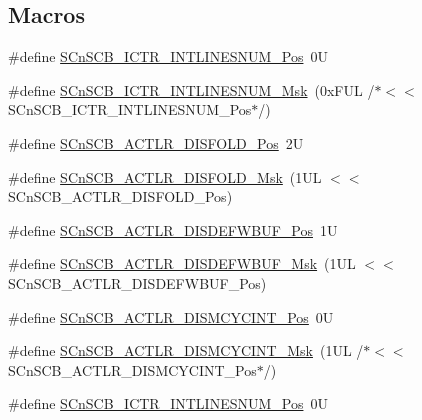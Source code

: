 \subsection*{Macros}
\begin{DoxyCompactItemize}
\item 
\#define \hyperlink{group___c_m_s_i_s___s_cn_s_c_b_ga0777ddf379af50f9ca41d40573bfffc5}{S\-Cn\-S\-C\-B\-\_\-\-I\-C\-T\-R\-\_\-\-I\-N\-T\-L\-I\-N\-E\-S\-N\-U\-M\-\_\-\-Pos}~0\-U
\item 
\#define \hyperlink{group___c_m_s_i_s___s_cn_s_c_b_ga3efa0f5210051464e1034b19fc7b33c7}{S\-Cn\-S\-C\-B\-\_\-\-I\-C\-T\-R\-\_\-\-I\-N\-T\-L\-I\-N\-E\-S\-N\-U\-M\-\_\-\-Msk}~(0x\-F\-U\-L /$\ast$$<$$<$ S\-Cn\-S\-C\-B\-\_\-\-I\-C\-T\-R\-\_\-\-I\-N\-T\-L\-I\-N\-E\-S\-N\-U\-M\-\_\-\-Pos$\ast$/)
\item 
\#define \hyperlink{group___c_m_s_i_s___s_cn_s_c_b_gaab395870643a0bee78906bb15ca5bd02}{S\-Cn\-S\-C\-B\-\_\-\-A\-C\-T\-L\-R\-\_\-\-D\-I\-S\-F\-O\-L\-D\-\_\-\-Pos}~2\-U
\item 
\#define \hyperlink{group___c_m_s_i_s___s_cn_s_c_b_gaa9dd2d4a2350499188f438d0aa9fd982}{S\-Cn\-S\-C\-B\-\_\-\-A\-C\-T\-L\-R\-\_\-\-D\-I\-S\-F\-O\-L\-D\-\_\-\-Msk}~(1\-U\-L $<$$<$ S\-Cn\-S\-C\-B\-\_\-\-A\-C\-T\-L\-R\-\_\-\-D\-I\-S\-F\-O\-L\-D\-\_\-\-Pos)
\item 
\#define \hyperlink{group___c_m_s_i_s___s_cn_s_c_b_gafa2eb37493c0f8dae77cde81ecf80f77}{S\-Cn\-S\-C\-B\-\_\-\-A\-C\-T\-L\-R\-\_\-\-D\-I\-S\-D\-E\-F\-W\-B\-U\-F\-\_\-\-Pos}~1\-U
\item 
\#define \hyperlink{group___c_m_s_i_s___s_cn_s_c_b_ga6cda7b7219232a008ec52cc8e89d5d08}{S\-Cn\-S\-C\-B\-\_\-\-A\-C\-T\-L\-R\-\_\-\-D\-I\-S\-D\-E\-F\-W\-B\-U\-F\-\_\-\-Msk}~(1\-U\-L $<$$<$ S\-Cn\-S\-C\-B\-\_\-\-A\-C\-T\-L\-R\-\_\-\-D\-I\-S\-D\-E\-F\-W\-B\-U\-F\-\_\-\-Pos)
\item 
\#define \hyperlink{group___c_m_s_i_s___s_cn_s_c_b_gaaa3e79f5ead4a32c0ea742b2a9ffc0cd}{S\-Cn\-S\-C\-B\-\_\-\-A\-C\-T\-L\-R\-\_\-\-D\-I\-S\-M\-C\-Y\-C\-I\-N\-T\-\_\-\-Pos}~0\-U
\item 
\#define \hyperlink{group___c_m_s_i_s___s_cn_s_c_b_ga2a2818f0489ad10b6ea2964e899d4cbc}{S\-Cn\-S\-C\-B\-\_\-\-A\-C\-T\-L\-R\-\_\-\-D\-I\-S\-M\-C\-Y\-C\-I\-N\-T\-\_\-\-Msk}~(1\-U\-L /$\ast$$<$$<$ S\-Cn\-S\-C\-B\-\_\-\-A\-C\-T\-L\-R\-\_\-\-D\-I\-S\-M\-C\-Y\-C\-I\-N\-T\-\_\-\-Pos$\ast$/)
\item 
\#define \hyperlink{group___c_m_s_i_s___s_cn_s_c_b_ga0777ddf379af50f9ca41d40573bfffc5}{S\-Cn\-S\-C\-B\-\_\-\-I\-C\-T\-R\-\_\-\-I\-N\-T\-L\-I\-N\-E\-S\-N\-U\-M\-\_\-\-Pos}~0\-U

\end{DoxyCompactItemize}
